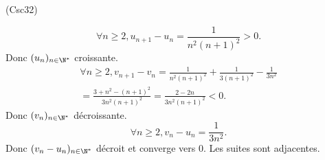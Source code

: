 \begin{tiny}(Csc32)\end{tiny}
\[
  \forall n \geq 2, 
  u_{n+1} - u_n = \frac{1}{n^2(n+1)^2} > 0.
\]
Donc $(u_n)_{n\in \N^*}$ croissante.
\begin{multline*}
  \forall n \geq 2, 
  v_{n+1} - v_n = \frac{1}{n^2(n+1)^2} + \frac{1}{3(n+1)^2} - \frac{1}{3n^2}\\
  = \frac{3 + n^2 - (n+1)^2}{3 n^2(n+1)^2}
  = \frac{2 - 2n}{3 n^2(n+1)^2} < 0.
\end{multline*}
Donc $(v_n)_{n\in \N^*}$ décroissante.
\[
  \forall n \geq 2, v_n - u_n = \frac{1}{3n^2}.
\]
Donc $(v_n - u_n)_{n\in \N^*}$ décroit et converge vers $0$. Les suites sont adjacentes.
